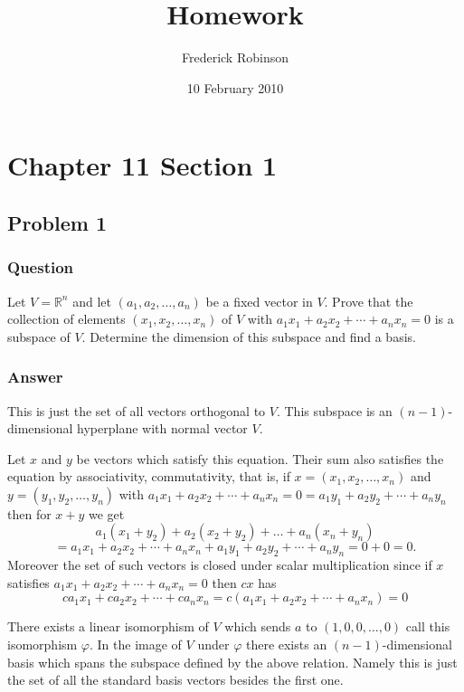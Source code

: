 \documentclass[12pt]{article}
\title{Homework}
\author{Frederick Robinson}
\date{10 February 2010}
\begin{document}

   \maketitle

\setcounter{tocdepth}{2} 

\tableofcontents

\section{Chapter 11 Section 1}
\subsection{Problem 1}

\subsubsection{Question}
Let $V=\mathbb{R}^n$ and let $(a_1,a_2,\dots,a_n)$ be a fixed vector in $V$. Prove that the collection of elements $(x_1,x_2,\dots,x_n)$ of $V$ with $a_1x_1+a_2x_2+\cdots+a_nx_n = 0$ is a subspace of $V$. Determine the dimension of this subspace and find a basis.
\subsubsection{Answer}
This is just the set of all vectors orthogonal to $V$. This subspace is an $(n-1)$-dimensional hyperplane with normal vector $V$.

Let $x$ and $y$ be vectors which satisfy this equation. Their sum also satisfies the equation by associativity, commutativity, that is, if $x=(x_1,x_2,\dots,x_n)$ and $y=(y_1,y_2,\dots,y_n)$ with $a_1x_1+a_2x_2+\cdots+a_nx_n = 0 = a_1y_1+a_2y_2+\cdots+a_ny_n $ then for $x + y$ we get
\[a_1(x_1 + y_2) + a_2 (x_2 +y_2) + \dots + a_n(x_n + y_n)\]
\[= a_1x_1+a_2x_2+\cdots+a_nx_n  + a_1y_1+a_2y_2+\cdots+a_ny_n = 0+0 =0.\]
Moreover the set of such vectors is closed under scalar multiplication since if $x$ satisfies $a_1x_1+a_2x_2+\cdots+a_nx_n = 0$ then $c x$ has 
\[ ca_1x_1+ca_2x_2+\cdots+ca_nx_n=c(a_1x_1+a_2x_2+\cdots+a_nx_n) = 0\]

There exists a linear isomorphism of $V$ which sends $a$ to $(1,0,0,\dots,0)$ call this isomorphism $\varphi$. In the image of $V$ under $\varphi$ there exists an $(n-1)$-dimensional basis which spans the subspace defined by the above relation. Namely this is just the set of all the standard basis vectors besides the first one.
\end{document}
